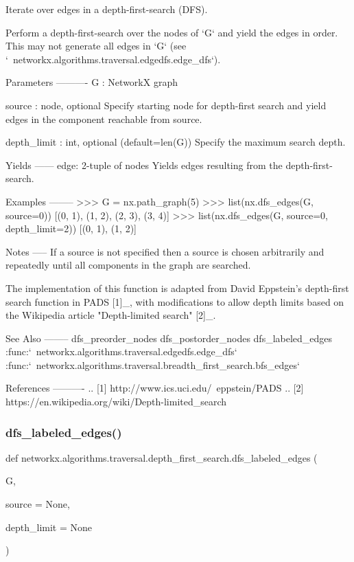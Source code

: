 \begin{DoxyVerb}Iterate over edges in a depth-first-search (DFS).

Perform a depth-first-search over the nodes of `G` and yield
the edges in order. This may not generate all edges in `G`
(see `~networkx.algorithms.traversal.edgedfs.edge_dfs`).

Parameters
----------
G : NetworkX graph

source : node, optional
   Specify starting node for depth-first search and yield edges in
   the component reachable from source.

depth_limit : int, optional (default=len(G))
   Specify the maximum search depth.

Yields
------
edge: 2-tuple of nodes
   Yields edges resulting from the depth-first-search.

Examples
--------
>>> G = nx.path_graph(5)
>>> list(nx.dfs_edges(G, source=0))
[(0, 1), (1, 2), (2, 3), (3, 4)]
>>> list(nx.dfs_edges(G, source=0, depth_limit=2))
[(0, 1), (1, 2)]

Notes
-----
If a source is not specified then a source is chosen arbitrarily and
repeatedly until all components in the graph are searched.

The implementation of this function is adapted from David Eppstein's
depth-first search function in PADS [1]_, with modifications
to allow depth limits based on the Wikipedia article
"Depth-limited search" [2]_.

See Also
--------
dfs_preorder_nodes
dfs_postorder_nodes
dfs_labeled_edges
:func:`~networkx.algorithms.traversal.edgedfs.edge_dfs`
:func:`~networkx.algorithms.traversal.breadth_first_search.bfs_edges`

References
----------
.. [1] http://www.ics.uci.edu/~eppstein/PADS
.. [2] https://en.wikipedia.org/wiki/Depth-limited_search
\end{DoxyVerb}
 \mbox{\label{namespacenetworkx_1_1algorithms_1_1traversal_1_1depth__first__search_a375253318515ec0a66325ea792e091ca}} 
\subsubsection{\texorpdfstring{dfs\+\_\+labeled\+\_\+edges()}{dfs\_labeled\_edges()}}
{\footnotesize\ttfamily def networkx.\+algorithms.\+traversal.\+depth\+\_\+first\+\_\+search.\+dfs\+\_\+labeled\+\_\+edges (\begin{DoxyParamCaption}\item[{}]{G,  }\item[{}]{source = {\ttfamily None},  }\item[{}]{depth\+\_\+limit = {\ttfamily None} }\end{DoxyParamCaption})}

